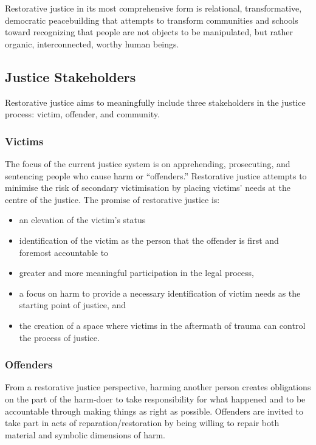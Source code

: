\documentclass{article}
\begin{document}
Restorative justice in its most comprehensive form is relational, transformative, democratic peacebuilding that attempts to transform communities and schools toward recognizing that people are not objects to be manipulated, but rather organic, interconnected, worthy human beings.

\subsection{Justice Stakeholders}

Restorative justice aims to meaningfully include three stakeholders in the justice process: victim, offender, and community.

\subsubsection*{Victims}

The focus of the current justice system is on apprehending, prosecuting, and sentencing people who cause harm or “offenders.” Restorative justice attempts to minimise the risk of secondary victimisation by placing victims’ needs at the centre of the justice. The promise of restorative justice is:

\begin{itemize}
    \item an elevation of the victim’s status
    \item identification of the victim as the person that the offender is first and foremost accountable to
    \item greater and more meaningful participation in the legal process,
    \item a focus on harm to provide a necessary identification of victim needs as the starting point of justice, and
    \item the creation of a space where victims in the aftermath of trauma can control the process of justice.
\end{itemize}

\subsubsection*{Offenders}

From a restorative justice perspective, harming another person creates obligations on the part of the harm-doer to take responsibility for what happened and to be accountable through making things as right as possible. Offenders are invited to take part in acts of reparation/restoration by being willing to repair both material and symbolic dimensions of harm.
\end{document}
